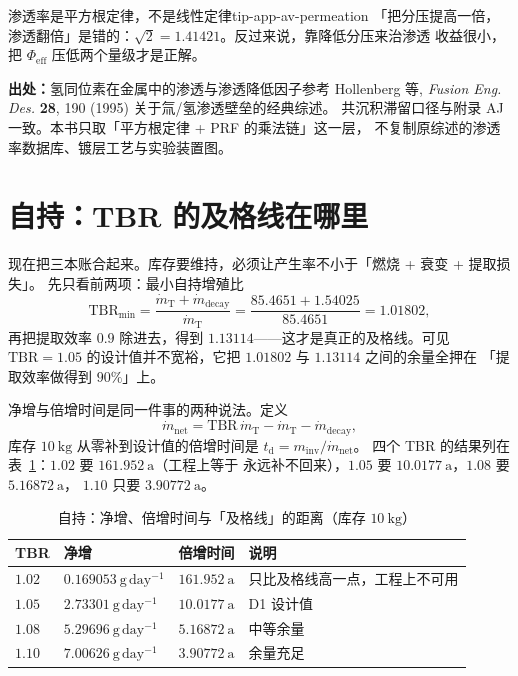 \begin{tip}{渗透率是平方根定律，不是线性定律}{tip-app-av-permeation}
「把分压提高一倍，渗透翻倍」是错的：$\sqrt{2}=1.41421$。反过来说，靠降低分压来治渗透
收益很小，把 $\Phi_\mathrm{eff}$ 压低两个量级才是正解。
\end{tip}

{\footnotesize
\textbf{出处：}氢同位素在金属中的渗透与渗透降低因子参考 Hollenberg 等,
\emph{Fusion Eng. Des.} \textbf{28}, 190 (1995) 关于氚/氢渗透壁垒的经典综述。
共沉积滞留口径与附录 AJ 一致。本书只取「平方根定律 + PRF 的乘法链」这一层，
不复制原综述的渗透率数据库、镀层工艺与实验装置图。
}

\section{自持：TBR 的及格线在哪里}
\label{sec:app-av-selfsuff}

现在把三本账合起来。库存要维持，必须让产生率不小于「燃烧 + 衰变 + 提取损失」。
先只看前两项：最小自持增殖比
\begin{equation}
\mathrm{TBR}_\mathrm{min}=\frac{\dot m_\mathrm{T}+\dot m_\mathrm{decay}}{\dot m_\mathrm{T}}
=\frac{85.4651+1.54025}{85.4651}=1.01802,
\label{eq:app-av-tbrmin2}
\end{equation}
再把提取效率 $0.9$ 除进去，得到 $1.13114$——这才是真正的及格线。可见 $\mathrm{TBR}=1.05$ 的设计值并不宽裕，它把 $1.01802$ 与 $1.13114$ 之间的余量全押在
「提取效率做得到 $90\%$」上。

净增与倍增时间是同一件事的两种说法。定义
\begin{equation}
\dot m_\mathrm{net}=\mathrm{TBR}\,\dot m_\mathrm{T}-\dot m_\mathrm{T}-\dot m_\mathrm{decay},
\label{eq:app-av-net}
\end{equation}
库存 $10\ \mathrm{kg}$ 从零补到设计值的倍增时间是 $t_\mathrm{d}=m_\mathrm{inv}/\dot m_\mathrm{net}$。
四个 TBR 的结果列在表~\ref{tab:app-av-selfsuff}：$1.02$ 要 $161.952\ \mathrm{a}$（工程上等于
永远补不回来），$1.05$ 要 $10.0177\ \mathrm{a}$，$1.08$ 要 $5.16872\ \mathrm{a}$，
$1.10$ 只要 $3.90772\ \mathrm{a}$。

\begin{table}[htbp]
\centering
\small
\caption{自持：净增、倍增时间与「及格线」的距离（库存 $10\ \mathrm{kg}$）}
\label{tab:app-av-selfsuff}
\begin{tabular}{p{2.4cm}p{3.0cm}p{3.4cm}p{5.2cm}}
\hline
TBR & 净增 & 倍增时间 & 说明 \\
\hline
$1.02$ & $0.169053\ \mathrm{g\,day^{-1}}$ & $161.952\ \mathrm{a}$ & 只比及格线高一点，工程上不可用 \\
$1.05$ & $2.73301\ \mathrm{g\,day^{-1}}$ & $10.0177\ \mathrm{a}$ & D1 设计值 \\
$1.08$ & $5.29696\ \mathrm{g\,day^{-1}}$ & $5.16872\ \mathrm{a}$ & 中等余量 \\
$1.10$ & $7.00626\ \mathrm{g\,day^{-1}}$ & $3.90772\ \mathrm{a}$ & 余量充足 \\
\hline
\end{tabular}
\end{table}

